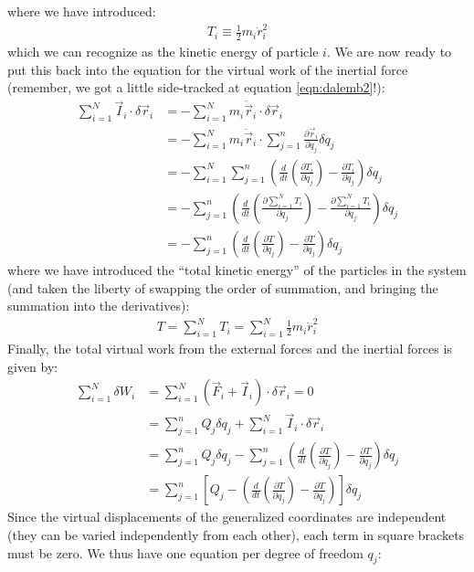 where we have introduced:
\begin{align}
T_i\equiv\frac{1}{2}m_i\dot{r}_i^2
\end{align}
which we can recognize as the kinetic energy of particle $i$. We are now ready to put this back into the equation for the virtual work of the inertial force (remember, we got a little side-tracked at equation \ref{eqn:dalemb2}!):
\begin{align}
\sum_{i=1}^N \vec{I}_i\cdot\delta\vec{r}_i&=-\sum_{i=1}^N m_i\ddot{\vec{r}}_i\cdot\delta\vec{r}_i\nonumber\\
&=-\sum_{i=1}^N m_i\ddot{\vec{r}}_i\cdot\sum_{j=1}^n\frac{\partial\vec{r}_i}{\partial q_j}\delta q_j   \nonumber\\
&=-\sum_{i=1}^N\sum_{j=1}^n\left(\frac{d}{dt}\left(\frac{\partial T_i}{\partial \dot{q}_j} \right) - \frac{\partial T_i}{\partial q_j}\right)\delta q_j   \nonumber\\
&=-\sum_{j=1}^n\left(\frac{d}{dt}\left(\frac{\partial\sum_{i=1}^N T_i}{\partial \dot{q}_j} \right) - \frac{\partial\sum_{i=1}^N T_i}{\partial q_j}\right)\delta q_j   \nonumber\\
&=-\sum_{j=1}^n\left(\frac{d}{dt}\left(\frac{\partial T}{\partial \dot{q}_j} \right) - \frac{\partial T}{\partial q_j}\right)\delta q_j   \nonumber
\end{align}
where we have introduced the ``total kinetic energy'' of the particles in the system (and taken the liberty of swapping the order of summation, and bringing the summation into the derivatives):
\begin{align}
T=\sum_{i=1}^N T_i=\sum_{i=1}^N\frac{1}{2}m_i\dot{r}_i^2
\end{align}
Finally, the total virtual work from the external forces and the inertial forces is given by:
\begin{align}
\sum_{i=1}^N\delta W_i&= \sum_{i=1}^N (\vec{F}_i+\vec{I}_i)\cdot\delta\vec{r}_i=0\nonumber\\
&=\sum_{j=1}^nQ_j\delta q_j+\sum_{i=1}^N \vec{I}_i\cdot\delta\vec{r}_i\nonumber\\
&=\sum_{j=1}^nQ_j\delta q_j-\sum_{j=1}^n\left(\frac{d}{dt}\left(\frac{\partial T}{\partial \dot{q}_j} \right) - \frac{\partial T}{\partial q_j}\right)\delta q_j \nonumber\\
&=\sum_{j=1}^n \left[ Q_j-\left(\frac{d}{dt}\left(\frac{\partial T}{\partial \dot{q}_j} \right) - \frac{\partial T}{\partial q_j}\right)\right]\delta q_j
\end{align}
Since the virtual displacements of the generalized coordinates are independent (they can be varied independently from each other), each term in square brackets must be zero. We thus have one equation per degree of freedom $q_j$:

